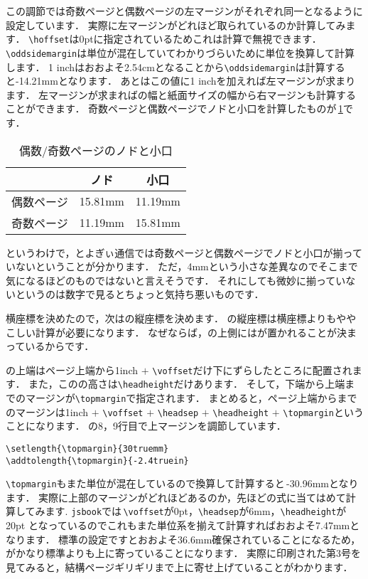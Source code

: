 この調節では奇数ページと偶数ページの左マージンがそれぞれ同一となるように設定しています．
実際に左マージンがどれほど取られているのか計算してみます．
\verb|\hoffset|は0ptに指定されているためこれは計算で無視できます．
\verb|\oddsidemargin|は単位が混在していてわかりづらいために単位を換算して計算します．
1 inchはおおよそ2.54cmとなることから\verb|\oddsidemargin|は計算すると-14.21mmとなります．
あとはこの値に1 inchを加えれば左マージンが求まります．
左マージンが求まればの幅と紙面サイズの幅から右マージンも計算することができます．
奇数ページと偶数ページでノドと小口を計算したものが\tablename\,\ref{tbl:oddevenmargins}です．
\begin{table}[!ht]
	\centering
	\caption{偶数/奇数ページのノドと小口}
	\label{tbl:oddevenmargins}
	\begin{tabular}{c|cc} \hline \hline
		& ノド & 小口 \\ \hline
		偶数ページ & 15.81mm & 11.19mm \\
		奇数ページ & 11.19mm & 15.81mm \\ \hline
	\end{tabular}
\end{table} 

というわけで，とよぎぃ通信では奇数ページと偶数ページでノドと小口が揃っていないということが分かります．
ただ，4mmという小さな差異なのでそこまで気になるほどのものではないと言えそうです．
それにしても微妙に揃っていないというのは数字で見るとちょっと気持ち悪いものです．

横座標を決めたので，次はの縦座標を決めます．
の縦座標は横座標よりもややこしい計算が必要になります．
なぜならば，の上側にはが置かれることが決まっているからです．

の上端はページ上端から1inch $+$ \verb|\voffset|だけ下にずらしたところに配置されます．
また，このの高さは\verb|\headheight|だけあります．
そして，下端から上端までのマージンが\verb|\topmargin|で指定されます．
まとめると，ページ上端からまでのマージンは1inch $+$ \verb|\voffset| $+$ \verb|\headsep| $+$ \verb|\headheight| $+$ \verb|\topmargin|ということになります．
の8，9行目で上マージンを調節しています．
\begin{verbatim}
\setlength{\topmargin}{30truemm}
\addtolength{\topmargin}{-2.4truein}
\end{verbatim}
\verb|\topmargin|もまた単位が混在しているので換算して計算すると\,-30.96mmとなります．
実際に上部のマージンがどれほどあるのか，先ほどの式に当てはめて計算してみます. 
\verb|jsbook|では\,\verb|\voffset|が0pt，\verb|\headsep|が6mm，\verb|\headheight|が20pt
となっているのでこれもまた単位系を揃えて計算すればおおよそ7.47mmとなります．
標準の設定ですとおおよそ36.6mm確保されていることになるため，
がかなり標準よりも上に寄っていることになります．
実際に印刷された第3号を見てみると，結構ページギリギリまで上に寄せ上げていることがわかります．


